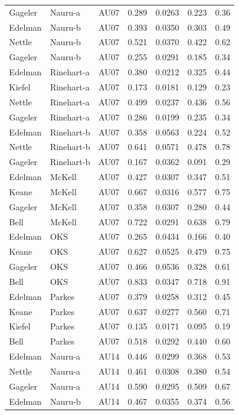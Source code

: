 \documentclass{monashthesis}
\begin{document}
\begin{center}
\begin{longtable}{lllllll}
Gageler & Nauru-a & AU07 & 0.289 & 0.0263 & 0.223 & 0.36 \\
Edelman & Nauru-b & AU07 & 0.393 & 0.0350 & 0.303 & 0.49 \\
Nettle & Nauru-b & AU07 & 0.521 & 0.0370 & 0.422 & 0.62 \\
Gageler & Nauru-b & AU07 & 0.255 & 0.0291 & 0.185 & 0.34 \\
Edelman & Rinehart-a & AU07 & 0.380 & 0.0212 & 0.325 & 0.44 \\
Kiefel & Rinehart-a & AU07 & 0.173 & 0.0181 & 0.129 & 0.23 \\
Nettle & Rinehart-a & AU07 & 0.499 & 0.0237 & 0.436 & 0.56 \\
Gageler & Rinehart-a & AU07 & 0.286 & 0.0199 & 0.235 & 0.34 \\
Edelman & Rinehart-b & AU07 & 0.358 & 0.0563 & 0.224 & 0.52 \\
Nettle & Rinehart-b & AU07 & 0.641 & 0.0571 & 0.478 & 0.78 \\
Gageler & Rinehart-b & AU07 & 0.167 & 0.0362 & 0.091 & 0.29 \\
Edelman & McKell & AU07 & 0.427 & 0.0307 & 0.347 & 0.51 \\
Keane & McKell & AU07 & 0.667 & 0.0316 & 0.577 & 0.75 \\
Gageler & McKell & AU07 & 0.358 & 0.0307 & 0.280 & 0.44 \\
Bell & McKell & AU07 & 0.722 & 0.0291 & 0.638 & 0.79 \\
Edelman & OKS & AU07 & 0.265 & 0.0434 & 0.166 & 0.40 \\
Keane & OKS & AU07 & 0.627 & 0.0525 & 0.479 & 0.75 \\
Gageler & OKS & AU07 & 0.466 & 0.0536 & 0.328 & 0.61 \\
Bell & OKS & AU07 & 0.833 & 0.0347 & 0.718 & 0.91 \\
Edelman & Parkes & AU07 & 0.379 & 0.0258 & 0.312 & 0.45 \\
Keane & Parkes & AU07 & 0.637 & 0.0277 & 0.560 & 0.71 \\
Kiefel & Parkes & AU07 & 0.135 & 0.0171 & 0.095 & 0.19 \\
Bell & Parkes & AU07 & 0.518 & 0.0292 & 0.440 & 0.60 \\
Edelman & Nauru-a & AU14 & 0.446 & 0.0299 & 0.368 & 0.53 \\
Nettle & Nauru-a & AU14 & 0.461 & 0.0308 & 0.380 & 0.54 \\
Gageler & Nauru-a & AU14 & 0.590 & 0.0295 & 0.509 & 0.67 \\
Edelman & Nauru-b & AU14 & 0.467 & 0.0355 & 0.374 & 0.56 \\

\end{longtable}
\end{center}
\end{document}
